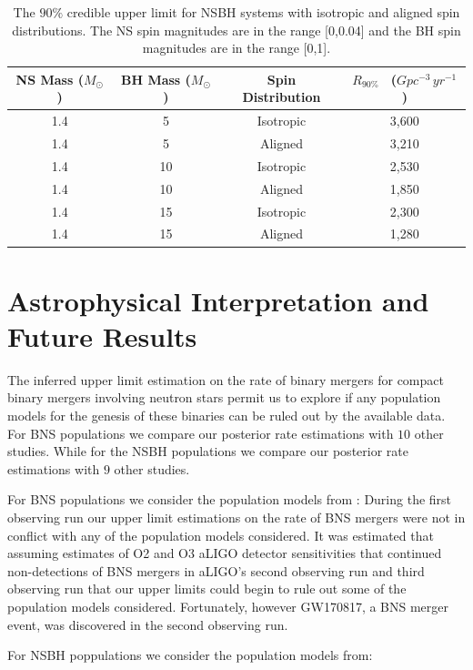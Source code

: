 \begin{table}[h!]\label{tbl:nsbh_posteriors}
\centering{}
 \begin{tabular}{||c c c c ||}
 \hline
 NS Mass ($M_\odot$) & BH Mass ($M_\odot$) &  Spin Distribution & $R_{90 \%}$ \, ($Gpc^{-3} \, yr^{-1}$) \\
 \hline\hline
 1.4 & 5 & Isotropic & 3,600 \\ 
 \hline
 1.4 & 5 & Aligned & 3,210 \\
 \hline
 1.4 & 10 & Isotropic & 2,530 \\
 \hline
 1.4 & 10 & Aligned & 1,850 \\
 \hline
 1.4 & 15 & Isotropic & 2,300 \\
 \hline
 1.4 & 15 & Aligned & 1,280 \\
 \hline
\end{tabular}
\caption{The $90\%$ credible upper limit for NSBH systems with isotropic and aligned  spin distributions. The NS spin magnitudes are in the range [0,0.04] and the BH spin magnitudes are in the range [0,1].}
\end{table}


\section{Astrophysical Interpretation and Future Results}
The inferred upper limit estimation on the rate of binary mergers for compact binary mergers involving neutron stars permit us to explore if any population models for the genesis of these binaries can be ruled out by the available data. For BNS populations we compare our posterior rate estimations with $10$ other studies. While for the NSBH populations we compare our posterior rate estimations with $9$ other studies.

For BNS populations we consider the population models from : During the first observing run our upper limit estimations on the rate of BNS mergers were not in conflict with any of the population models considered. It was estimated that assuming estimates of O2 and O3 aLIGO detector sensitivities that continued non-detections of BNS mergers in aLIGO's  second observing run and third observing run that our upper limits could begin to rule out some of the population models considered. Fortunately, however GW170817, a BNS merger event, was discovered in the second observing run.

For NSBH poppulations we consider the population models from:



